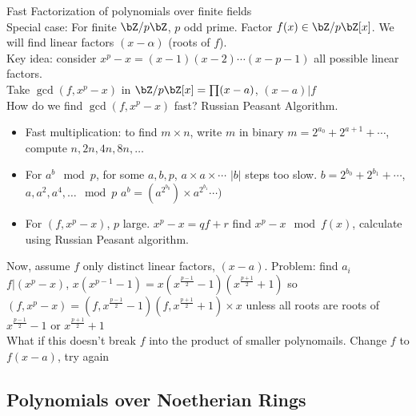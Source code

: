 \noindent
Fast Factorization of polynomials over finite fields \\
Special case: For finite $\bZ/p\bZ$, $p$ odd prime. Factor $f(x) \in \bZ/p\bZ[x]$. We will find linear factors $(x-\alpha)$ (roots of $f$). \\
Key idea: consider $x^p-x = (x-1)(x-2) \cdots (x-p-1)$ all possible linear factors. \\
Take $\gcd(f , x^p-x)$ in $\bZ/p\bZ[x] = \prod (x-a)$, $(x-a)|f$ \\
How do we find $\gcd(f, x^p-x)$ fast? Russian Peasant Algorithm. 
\begin{itemize}
    \item Fast multiplication: to find $m \times n$, write $m$ in binary $m = 2^{a_0} + 2^{a+1} + \cdots$, compute $n, 2n , 4n, 8n, \ldots$ 
    \item For $a^b  \mod p$, for some $a,b,p$, $a \times a \times \cdots$ $|b|$ steps too slow. $b = 2^{b_0} + 2^{b_1} + \cdots$, $a, a^2, a^4, \ldots \mod p$ $a^b = (a^{2^{b_0}}) \times a^{2^{b_1}} \cdots )$ 
    \item For $(f, x^p-x)$, $p$ large. $x^p-x = qf + r$ find $x^p-x \mod f(x)$, calculate using Russian Peasant algorithm. 
\end{itemize}
Now, assume $f$ only distinct linear factors, $(x-a)$. Problem: find $a_i$ \\
$f | (x^p-x)$, $x(x^{p-1}-1) = x(x^{\frac{p-1}{2}}-1)(x^{\frac{p+1}{2}}+1)$ so $(f,x^p-x) = (f,x^{\frac{p-1}{2}}-1 )(f, x^{\frac{p+1}{2}}+1) \times x$ unless all roots are roots of $x^{\frac{p-1}{2}}-1$ or $x^{\frac{p+1}{2}}+1$ \\ 
What if this doesn't break $f$ into the product of smaller polynomails. Change $f$ to $f(x-a)$, try again 


\noindent
\subsection{Polynomials over Noetherian Rings} 